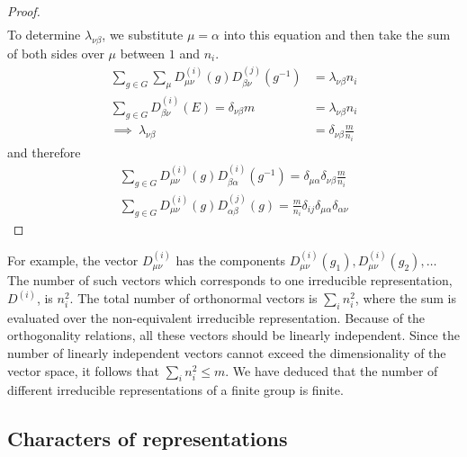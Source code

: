 \begin{proof}
\begin{align}
    \end{align}
    To determine $\lambda_{\nu\beta}$, we substitute $\mu=\alpha$ into this
    equation and then take the sum of both sides over $\mu$ between $1$ and $n_i$.
    \begin{align}
        \sum_{g\in G}\sum_\mu D^{(i)}_{\mu\nu}(g)D^{(j)}_{\beta\nu}(g^{-1})&=
        \lambda_{\nu\beta}n_i\\
        \sum_{g\in G}D^{(i)}_{\beta\nu}(E)=\delta_{\nu\beta}m&=
        \lambda_{\nu\beta}n_i\\
        \implies\ \lambda_{\nu\beta}&=\delta_{\nu\beta}\frac m{n_i}
    \end{align}
    and therefore
    \begin{align}
        \sum_{g\in G}D^{(i)}_{\mu\nu}(g)D^{(i)}_{\beta\alpha}(g^{-1})=
        \delta_{\mu\alpha}\delta_{\nu\beta}\frac m{n_i}\\
        \sum_{g\in G}D^{(i)}_{\mu\nu}(g)D^{(j)}_{\alpha\beta}(g)=\frac m{n_i}
        \delta_{ij}\delta_{\mu\alpha}\delta_{\alpha\nu}
    \end{align}
\end{proof}

For example, the vector $D^{(i)}_{\mu\nu}$ has the components
$D^{(i)}_{\mu\nu}(g_1),D^{(i)}_{\mu\nu}(g_2),\dots$
The number of such vectors which corresponds to one irreducible representation,
$D^{(i)}$, is $n_i^2$. The total number of orthonormal vectors is $\sum_i n_i^2$,
where the sum is evaluated over the non-equivalent irreducible representation.
Because of the orthogonality relations, all these vectors should be linearly
independent. Since the number of linearly independent vectors cannot exceed the
dimensionality of the vector space, it follows that $\sum_i n_i^2\leq m$.
We have deduced that the number of different irreducible representations of a
finite group is finite.


\subsection{Characters of representations} %
\label{sub:Characters of representations}

